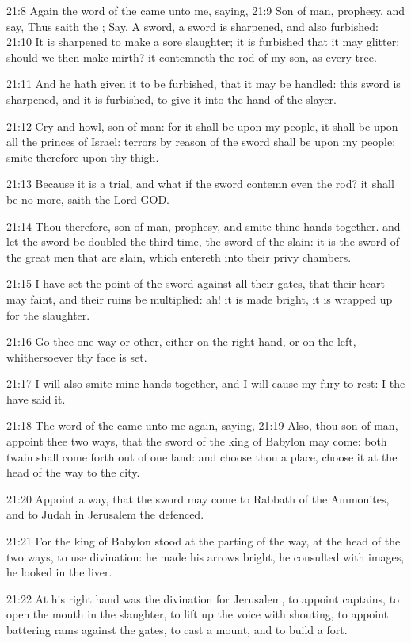 21:8 Again the word of the \LORD came unto me, saying, 21:9 Son of man, prophesy, and say, Thus saith the \LORD; Say, A sword, a sword is sharpened, and also furbished: 21:10 It is sharpened to make a sore slaughter; it is furbished that it may glitter: should we then make mirth? it contemneth the rod of my son, as every tree.

21:11 And he hath given it to be furbished, that it may be handled: this sword is sharpened, and it is furbished, to give it into the hand of the slayer.

21:12 Cry and howl, son of man: for it shall be upon my people, it shall be upon all the princes of Israel: terrors by reason of the sword shall be upon my people: smite therefore upon thy thigh.

21:13 Because it is a trial, and what if the sword contemn even the rod?  it shall be no more, saith the Lord GOD.

21:14 Thou therefore, son of man, prophesy, and smite thine hands together. and let the sword be doubled the third time, the sword of the slain: it is the sword of the great men that are slain, which entereth into their privy chambers.

21:15 I have set the point of the sword against all their gates, that their heart may faint, and their ruins be multiplied: ah! it is made bright, it is wrapped up for the slaughter.

21:16 Go thee one way or other, either on the right hand, or on the left, whithersoever thy face is set.

21:17 I will also smite mine hands together, and I will cause my fury to rest: I the \LORD have said it.

21:18 The word of the \LORD came unto me again, saying, 21:19 Also, thou son of man, appoint thee two ways, that the sword of the king of Babylon may come: both twain shall come forth out of one land: and choose thou a place, choose it at the head of the way to the city.

21:20 Appoint a way, that the sword may come to Rabbath of the Ammonites, and to Judah in Jerusalem the defenced.

21:21 For the king of Babylon stood at the parting of the way, at the head of the two ways, to use divination: he made his arrows bright, he consulted with images, he looked in the liver.

21:22 At his right hand was the divination for Jerusalem, to appoint captains, to open the mouth in the slaughter, to lift up the voice with shouting, to appoint battering rams against the gates, to cast a mount, and to build a fort.

